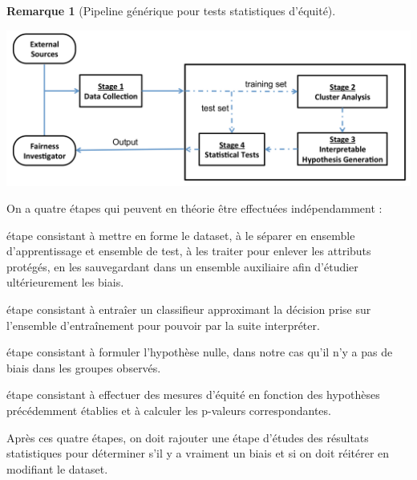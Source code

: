 \documentclass[draft]{article}
\theoremstyle{definition}
\newtheorem{myRem}{Remarque}
\begin{document}
\begin{myRem}[Pipeline générique pour tests statistiques d'équité] \hfill
  \begin{center}
    \includegraphics[width=\textwidth]{genericPipeline}
  \end{center}
  On a quatre étapes qui peuvent en théorie être effectuées indépendamment :
  \begin{description}[style=nextline]
  \item[1. Acquisition de donnée]
    étape consistant à mettre en forme le dataset, à le séparer en ensemble d'apprentissage et ensemble de test, à les traiter pour enlever les attributs protégés, en les sauvegardant dans un ensemble auxiliaire afin d'étudier ultérieurement les biais.

  \item[2. Partionnement de données et apprentissage]
    étape consistant à entraîer un classifieur approximant la décision prise sur l'ensemble d'entraînement pour pouvoir par la suite interpréter.

  \item[3. Génération d'hypothèse interprétable]
    étape consistant à formuler l'hypothèse nulle, dans notre cas qu'il n'y a pas de biais dans les groupes observés.

  \item[4. Tests statistiques]
    étape consistant à effectuer des mesures d'équité en fonction des hypothèses précédemment établies et à calculer les p-valeurs correspondantes.
  \end{description}

  Après ces quatre étapes, on doit rajouter une étape d'études des résultats statistiques pour déterminer s'il y a vraiment un biais et si on doit réitérer en modifiant le dataset.
\end{myRem}
\end{document}
